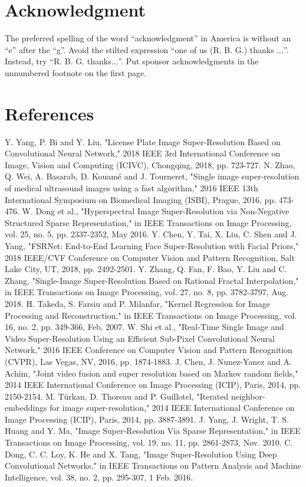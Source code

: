 \documentclass[conference]{IEEEtran}
\begin{document}
\section*{Acknowledgment}

The preferred spelling of the word ``acknowledgment'' in America is without 
an ``e'' after the ``g''. Avoid the stilted expression ``one of us (R. B. 
G.) thanks $\ldots$''. Instead, try ``R. B. G. thanks$\ldots$''. Put sponsor 
acknowledgments in the unnumbered footnote on the first page.

\section*{References}

\begin{thebibliography}{00}
 Y. Yang, P. Bi and Y. Liu, "License Plate Image Super-Resolution Based on Convolutional Neural Network," 2018 IEEE 3rd International Conference on Image, Vision and Computing (ICIVC), Chongqing, 2018, pp. 723-727.
 N. Zhao, Q. Wei, A. Basarab, D. Kouamé and J. Tourneret, "Single image super-resolution of medical ultrasound images using a fast algorithm," 2016 IEEE 13th International Symposium on Biomedical Imaging (ISBI), Prague, 2016, pp. 473-476.
 W. Dong et al., "Hyperspectral Image Super-Resolution via Non-Negative Structured Sparse Representation," in IEEE Transactions on Image Processing, vol. 25, no. 5, pp. 2337-2352, May 2016.
 Y. Chen, Y. Tai, X. Liu, C. Shen and J. Yang, "FSRNet: End-to-End Learning Face Super-Resolution with Facial Priors," 2018 IEEE/CVF Conference on Computer Vision and Pattern Recognition, Salt Lake City, UT, 2018, pp. 2492-2501.
 Y. Zhang, Q. Fan, F. Bao, Y. Liu and C. Zhang, "Single-Image Super-Resolution Based on Rational Fractal Interpolation," in IEEE Transactions on Image Processing, vol. 27, no. 8, pp. 3782-3797, Aug. 2018.
 H. Takeda, S. Farsiu and P. Milanfar, "Kernel Regression for Image Processing and Reconstruction," in IEEE Transactions on Image Processing, vol. 16, no. 2, pp. 349-366, Feb. 2007.
 W. Shi et al., "Real-Time Single Image and Video Super-Resolution Using an Efficient Sub-Pixel Convolutional Neural Network," 2016 IEEE Conference on Computer Vision and Pattern Recognition (CVPR), Las Vegas, NV, 2016, pp. 1874-1883.
 J. Chen, J. Nunez-Yanez and A. Achim, "Joint video fusion and super resolution based on Markov random fields," 2014 IEEE International Conference on Image Processing (ICIP), Paris, 2014, pp. 2150-2154.
 M. Türkan, D. Thoreau and P. Guillotel, "Iterated neighbor-embeddings for image super-resolution," 2014 IEEE International Conference on Image Processing (ICIP), Paris, 2014, pp. 3887-3891.
 J. Yang, J. Wright, T. S. Huang and Y. Ma, "Image Super-Resolution Via Sparse Representation," in IEEE Transactions on Image Processing, vol. 19, no. 11, pp. 2861-2873, Nov. 2010.
 C. Dong, C. C. Loy, K. He and X. Tang, "Image Super-Resolution Using Deep Convolutional Networks," in IEEE Transactions on Pattern Analysis and Machine Intelligence, vol. 38, no. 2, pp. 295-307, 1 Feb. 2016.



\end{thebibliography}
\end{document}

